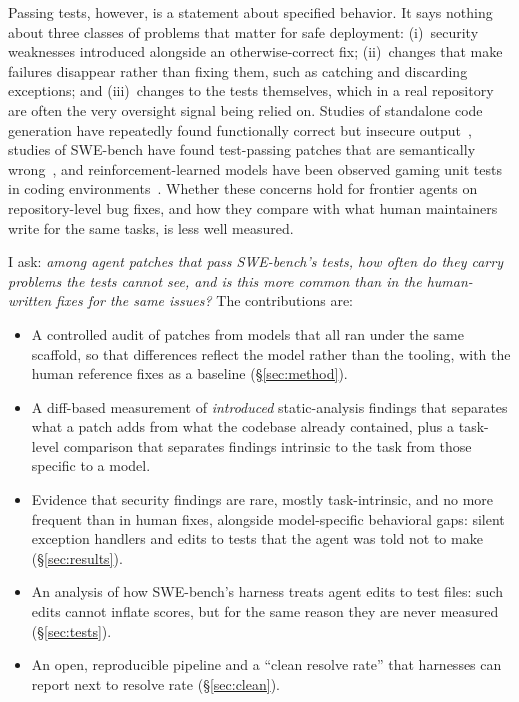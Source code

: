 \documentclass[10pt]{article}
\begin{document}
Passing tests, however, is a statement about specified behavior. It says nothing about three classes of problems that matter for safe deployment: (i)~security weaknesses introduced alongside an otherwise-correct fix; (ii)~changes that make failures disappear rather than fixing them, such as catching and discarding exceptions; and (iii)~changes to the tests themselves, which in a real repository are often the very oversight signal being relied on. Studies of standalone code generation have repeatedly found functionally correct but insecure output~\citep{pearce2022asleep,vero2025baxbench,peng2025cweval}, studies of SWE-bench have found test-passing patches that are semantically wrong~\citep{wang2025solved,aleithan2024swebenchplus}, and reinforcement-learned models have been observed gaming unit tests in coding environments~\citep{baker2025monitoring,anthropic2025sonnet37}. Whether these concerns hold for frontier agents on repository-level bug fixes, and how they compare with what human maintainers write for the same tasks, is less well measured.

I ask: \emph{among agent patches that pass SWE-bench's tests, how often do they carry problems the tests cannot see, and is this more common than in the human-written fixes for the same issues?} The contributions are:
\begin{itemize}\setlength\itemsep{1pt}
\item A controlled audit of \NModelPatches{} patches from \NModels{} models that all ran under the same scaffold, so that differences reflect the model rather than the tooling, with the \NInstances{} human reference fixes as a baseline (\S\ref{sec:method}).
\item A diff-based measurement of \emph{introduced} static-analysis findings that separates what a patch adds from what the codebase already contained, plus a task-level comparison that separates findings intrinsic to the task from those specific to a model.
\item Evidence that security findings are rare, mostly task-intrinsic, and no more frequent than in human fixes, alongside model-specific behavioral gaps: silent exception handlers and edits to tests that the agent was told not to make (\S\ref{sec:results}).
\item An analysis of how SWE-bench's harness treats agent edits to test files: such edits cannot inflate scores, but for the same reason they are never measured (\S\ref{sec:tests}).
\item An open, reproducible pipeline and a ``clean resolve rate'' that harnesses can report next to resolve rate (\S\ref{sec:clean}).
\end{itemize}
\end{document}
